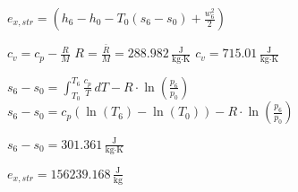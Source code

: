 \( e_{x,str} = (h_6 - h_0 - T_0 (s_6 - s_0) + \frac{w_6^2}{2}) \)  

\( c_v = c_p - \frac{R}{M} \)  
\( R = \frac{\bar{R}}{M} = 288.982 \, \frac{\text{J}}{\text{kg·K}} \)  
\( c_v = 715.01 \, \frac{\text{J}}{\text{kg·K}} \)  

\( s_6 - s_0 = \int_{T_0}^{T_6} \frac{c_p}{T} \, dT - R \cdot \ln \left( \frac{p_6}{p_0} \right) \)  
\( s_6 - s_0 = c_p \left( \ln(T_6) - \ln(T_0) \right) - R \cdot \ln \left( \frac{p_6}{p_0} \right) \)  

\( s_6 - s_0 = 301.361 \, \frac{\text{J}}{\text{kg·K}} \)  

\( e_{x,str} = 156239.168 \, \frac{\text{J}}{\text{kg}} \)